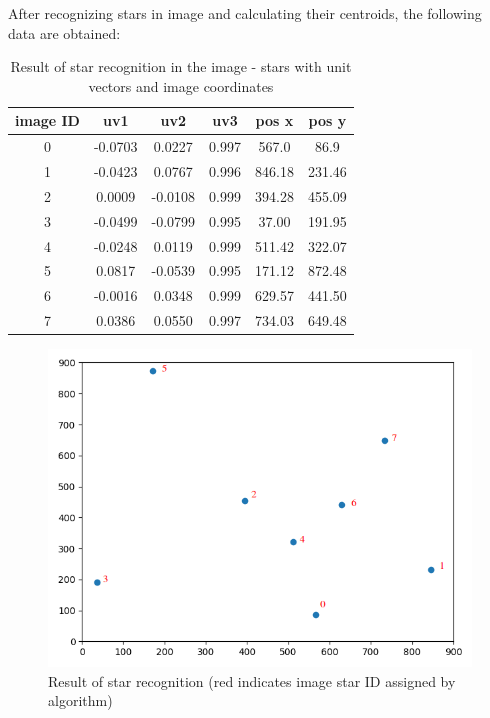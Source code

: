 \documentclass[12pt,a4paper,oneside]{article}
\begin{document}
After recognizing stars in image and calculating their centroids, the following data are obtained:


\renewcommand{\arraystretch}{1.5}
\begin{table}[!htbp]
\centering
\begin{tabular}{|c|c|c|c|c|c|}
\hline 
image ID & uv1 & uv2 & uv3 & pos x & pos y \\ 
\hline 
0 &  -0.0703 &  0.0227 & 0.997 &  567.0 &  86.9 \\
\hline 
1 &  -0.0423 &  0.0767 & 0.996 &  846.18 &  231.46 \\
\hline 
2 &   0.0009 & -0.0108 & 0.999 &  394.28 &  455.09 \\
\hline 
3 &  -0.0499 & -0.0799 & 0.995 &  37.00 &  191.95 \\
\hline 
4 &  -0.0248 &  0.0119 & 0.999 &  511.42 &  322.07 \\
\hline 
5 &   0.0817 & -0.0539 & 0.995 &  171.12 &  872.48 \\
\hline 
6 &  -0.0016 &  0.0348 & 0.999 &  629.57 &  441.50 \\
\hline 
7 &  0.0386 & 0.0550 & 0.997 & 734.03 & 649.48 \\
\hline 
\end{tabular}
\caption{Result of star recognition in the image - stars with unit vectors and image coordinates}
\label{tab:example_1}
\end{table}


\begin{figure}[!htbp]
\includegraphics[scale=0.6]{example_1.png}
\centering
\caption{Result of star recognition (red indicates image star ID assigned by algorithm)}
\label{fig:example_1}
\end{figure}
\end{document}
